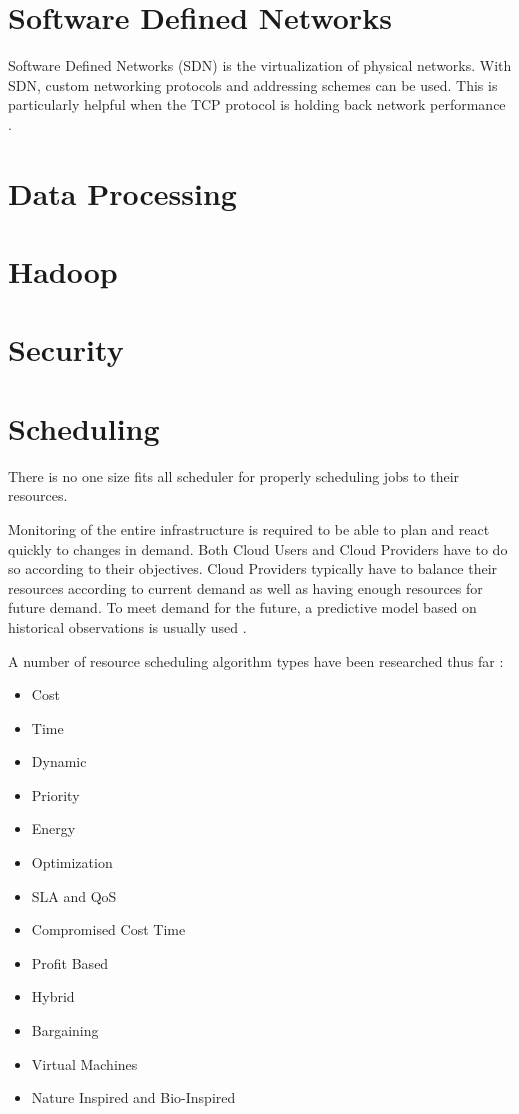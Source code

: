 \documentclass[fullapage,12pt]{article}
\begin{document}
\section{Software Defined Networks} \label{sec:sdn}

Software Defined Networks (SDN) is the virtualization of physical networks. With SDN, custom networking protocols and addressing schemes can be used. This is particularly helpful when the TCP protocol is holding back network performance \cite{Jennings2015}.

\section{Data Processing} \label{sec:data-processing}

\section{Hadoop} \label{sec:hadoop}

\section{Security} \label{sec:security}

\section{Scheduling} \label{sec:scheduling}

There is no one size fits all scheduler for properly scheduling jobs to their resources.

Monitoring of the entire infrastructure is required to be able to plan and react quickly to changes in demand. Both Cloud Users and Cloud Providers have to do so according to their objectives.
Cloud Providers typically have to balance their resources according to current demand as well as having enough resources for future demand. To meet demand for the future, a predictive model based on historical observations is usually used \cite{Jennings2015}.

A number of resource scheduling algorithm types have been researched thus far \cite{Singh2016}:
\begin{itemize}
    \item Cost
    \item Time
    \item Dynamic
    \item Priority
    \item Energy
    \item Optimization
    \item SLA and QoS
    \item Compromised Cost Time
    \item Profit Based
    \item Hybrid
    \item Bargaining
    \item Virtual Machines
    \item Nature Inspired and Bio-Inspired
\end{itemize}
\end{document}
